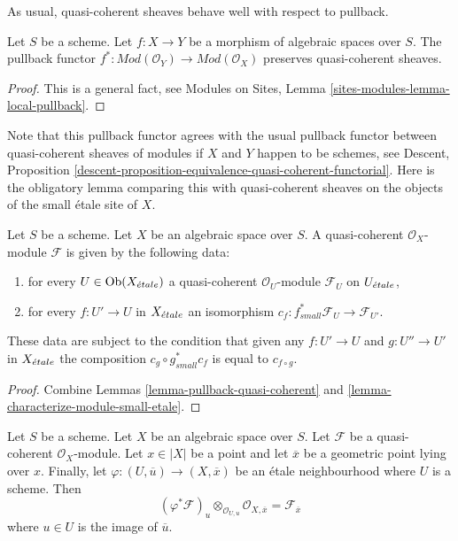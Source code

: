 \medskip\noindent
As usual, quasi-coherent sheaves behave well with respect to pullback.

\begin{lemma}
\label{lemma-pullback-quasi-coherent}
Let $S$ be a scheme.
Let $f : X \to Y$ be a morphism of algebraic spaces over $S$.
The pullback functor
$f^* : \textit{Mod}(\mathcal{O}_Y) \to \textit{Mod}(\mathcal{O}_X)$
preserves quasi-coherent sheaves.
\end{lemma}

\begin{proof}
This is a general fact, see
Modules on Sites, Lemma \ref{sites-modules-lemma-local-pullback}.
\end{proof}

\noindent
Note that this pullback functor agrees with the usual pullback functor
between quasi-coherent sheaves of modules if $X$ and $Y$ happen to be
schemes, see
Descent, Proposition
\ref{descent-proposition-equivalence-quasi-coherent-functorial}.
Here is the obligatory lemma comparing this with quasi-coherent sheaves
on the objects of the small \'etale site of $X$.

\begin{lemma}
\label{lemma-characterize-quasi-coherent-small-etale}
Let $S$ be a scheme. Let $X$ be an algebraic space over $S$.
A quasi-coherent $\mathcal{O}_X$-module $\mathcal{F}$
is given by the following data:
\begin{enumerate}
\item for every $U \in \mathop{\mathrm{Ob}}\nolimits(X_{\acute{e}tale})$ a quasi-coherent
$\mathcal{O}_U$-module $\mathcal{F}_U$ on $U_{\acute{e}tale}$,
\item for every $f : U' \to U$ in $X_{\acute{e}tale}$ an isomorphism
$c_f : f_{small}^*\mathcal{F}_U \to \mathcal{F}_{U'}$.
\end{enumerate}
These data are subject to the condition that given any $f : U' \to U$
and $g : U'' \to U'$ in $X_{\acute{e}tale}$ the composition
$c_g \circ g_{small}^*c_f$ is equal to $c_{f \circ g}$.
\end{lemma}

\begin{proof}
Combine Lemmas \ref{lemma-pullback-quasi-coherent} and
\ref{lemma-characterize-module-small-etale}.
\end{proof}

\begin{lemma}
\label{lemma-stalk-quasi-coherent}
Let $S$ be a scheme.
Let $X$ be an algebraic space over $S$.
Let $\mathcal{F}$ be a quasi-coherent $\mathcal{O}_X$-module.
Let $x \in |X|$ be a point and let $\overline{x}$ be a geometric
point lying over $x$. Finally, let
$\varphi : (U, \overline{u}) \to (X, \overline{x})$
be an \'etale neighbourhood where $U$ is a scheme.
Then
$$
(\varphi^*\mathcal{F})_u \otimes_{\mathcal{O}_{U, u}}
\mathcal{O}_{X, \overline{x}} =
\mathcal{F}_{\overline{x}}
$$
where $u \in U$ is the image of $\overline{u}$.
\end{lemma}

